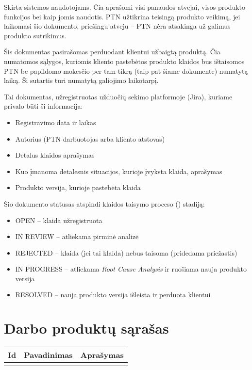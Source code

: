 \newcommand{\describeWorkProd}[2]{
    \expandafter\def\csname desc#1\endcsname{#2}
}
\newcommand{\printRow}[1]{
        \workProdId{#1} &
        \workProdName{#1} &
        \csname desc#1\endcsname \\ \hline
}
\newcommand{\workProdDescriptions}{
    \forlistloop{\printRow}{\WorkProdList}
}

\describeWorkProd{Manual}{Skirta sistemos naudotojams. Čia aprašomi visi panaudos atvejai, visos produkto funkcijos bei kaip jomis naudotis. PTN užtikrina teisingą produkto veikimą, jei laikomasi šio dokumento, priešingu atveju -- PTN nėra atsakinga už galimus produkto sutrikimus.
}

\describeWorkProd{Warranty}{Šis dokumentas pasirašomas perduodant klientui užbaigtą produktą. Čia numatomos sąlygos, kuriomis kliento pastebėtos produkto klaidos bus ištaisomos PTN be papildomo mokesčio per tam tikrą (taip pat šiame dokumente) numatytą laiką. Ši sutartis turi numatytą galiojimo laikotarpį.
}

\describeWorkProd{Ticket}{Tai dokumentas, užregistruotas užduočių sekimo platformoje (Jira), kuriame privalo būti ši informacija:
\begin{itemize}
    \item Registravimo data ir laikas
    \item Autorius (PTN darbuotojas arba kliento atstovas)
    \item Detalus klaidos aprašymas
    \item Kuo įmanoma detalesnis situacijos, kurioje įvyksta klaida, aprašymas
    \item Produkto versija, kurioje pastebėta klaida
\end{itemize}
Šio dokumento statusas atspindi klaidos taisymo proceso (\processId{BugFix}) stadiją:
\begin{itemize}
    \item OPEN -- klaida užregistruota
    \item IN REVIEW -- atliekama pirminė analizė
    \item REJECTED -- klaida (jei tai klaida) nebus taisoma (pridedama priežastis)
    \item IN PROGRESS -- atliekama \textit{Root Cause Analysis} ir ruošiama nauja produkto versija
    \item RESOLVED -- nauja produkto versija išleista ir perduota klientui
\end{itemize}
}


\section{Darbo produktų sąrašas}

\begin{longtable}{|c|p{}|p{}|}
    \hline
    \textbf{Id} & \textbf{Pavadinimas} & \textbf{Aprašymas} \\ \hline
    \workProdDescriptions
\end{longtable}